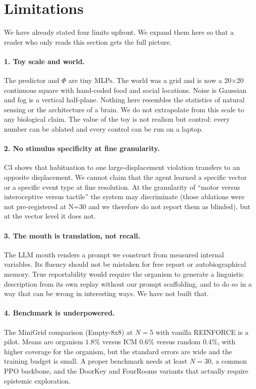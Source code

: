 \documentclass[11pt,a4paper]{article}
\begin{document}
\section{Limitations}
\label{sec:limitations}

We have already stated four limits upfront. We expand them here so that a reader who only reads this section gets the full picture.

\paragraph{1. Toy scale and world.} The predictor and $\Phi$ are tiny MLPs. The world was a grid and is now a 20$\times$20 continuous square with hand-coded food and social locations. Noise is Gaussian and fog is a vertical half-plane. Nothing here resembles the statistics of natural sensing or the architecture of a brain. We do not extrapolate from this scale to any biological claim. The value of the toy is not realism but control: every number can be ablated and every control can be run on a laptop.

\paragraph{2. No stimulus specificity at fine granularity.} C3 shows that habituation to one large-displacement violation transfers to an opposite displacement. We cannot claim that the agent learned a specific vector or a specific event type at fine resolution. At the granularity of ``motor versus interoceptive versus tactile'' the system may discriminate (those ablations were not pre-registered at N=30 and we therefore do not report them as blinded), but at the vector level it does not.

\paragraph{3. The mouth is translation, not recall.} The LLM mouth renders a prompt we construct from measured internal variables. Its fluency should not be mistaken for free report or autobiographical memory. True reportability would require the organism to generate a linguistic description from its own replay without our prompt scaffolding, and to do so in a way that can be wrong in interesting ways. We have not built that.

\paragraph{4. Benchmark is underpowered.} The MiniGrid comparison (Empty-8x8) at $N=5$ with vanilla REINFORCE is a pilot. Means are organism $1.8\%$ versus ICM $0.6\%$ versus random $0.4\%$, with higher coverage for the organism, but the standard errors are wide and the training budget is small. A proper benchmark needs at least $N=30$, a common PPO backbone, and the DoorKey and FourRooms variants that actually require epistemic exploration.
\end{document}

